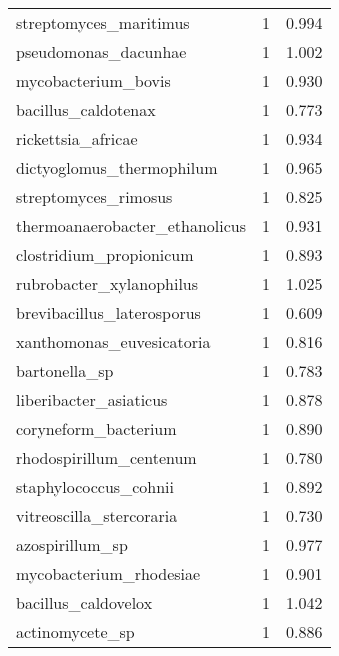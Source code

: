 \begin{tabular}{lrr}
                      streptomyces\_maritimus &                   1 &     0.994 \\
                        pseudomonas\_dacunhae &                   1 &     1.002 \\
                         mycobacterium\_bovis &                   1 &     0.930 \\
                         bacillus\_caldotenax &                   1 &     0.773 \\
                          rickettsia\_africae &                   1 &     0.934 \\
                   dictyoglomus\_thermophilum &                   1 &     0.965 \\
                        streptomyces\_rimosus &                   1 &     0.825 \\
              thermoanaerobacter\_ethanolicus &                   1 &     0.931 \\
                     clostridium\_propionicum &                   1 &     0.893 \\
                    rubrobacter\_xylanophilus &                   1 &     1.025 \\
                  brevibacillus\_laterosporus &                   1 &     0.609 \\
                   xanthomonas\_euvesicatoria &                   1 &     0.816 \\
                               bartonella\_sp &                   1 &     0.783 \\
                      liberibacter\_asiaticus &                   1 &     0.878 \\
                        coryneform\_bacterium &                   1 &     0.890 \\
                     rhodospirillum\_centenum &                   1 &     0.780 \\
                       staphylococcus\_cohnii &                   1 &     0.892 \\
                    vitreoscilla\_stercoraria &                   1 &     0.730 \\
                             azospirillum\_sp &                   1 &     0.977 \\
                     mycobacterium\_rhodesiae &                   1 &     0.901 \\
                         bacillus\_caldovelox &                   1 &     1.042 \\
                             actinomycete\_sp &                   1 &     0.886 \\

\end{tabular}
